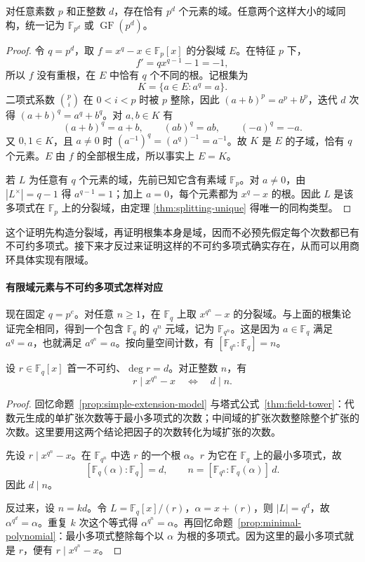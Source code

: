 \documentclass[lang=cn,a4paper,fontset=none,zihao=false,10pt,openany,twoside]{beautybook}
\numberwithin{algorithm}{chapter}
\begin{document}
\begin{theorem}[有限域的存在与唯一性]\label{thm:finite-field-existence}
对任意素数 $p$ 和正整数 $d$，存在恰有 $p^d$ 个元素的域。任意两个这样大小的域同构，统一记为 $\mathbb F_{p^d}$ 或 $\operatorname{GF}(p^d)$。
\end{theorem}
\begin{proof}
令 $q=p^d$，取 $f=x^q-x\in\mathbb F_p[x]$ 的分裂域 $E$。在特征 $p$ 下，
\[
 f'=qx^{q-1}-1=-1,
\]
所以 $f$ 没有重根，在 $E$ 中恰有 $q$ 个不同的根。记根集为
\[
 K=\{a\in E:a^q=a\}.
\]
二项式系数 $\binom pi$ 在 $0<i<p$ 时被 $p$ 整除，因此 $(a+b)^p=a^p+b^p$，迭代 $d$ 次得 $(a+b)^q=a^q+b^q$。对 $a,b\in K$ 有
\[
 (a+b)^q=a+b,\qquad (ab)^q=ab,\qquad(-a)^q=-a.
\]
又 $0,1\in K$，且 $a\ne0$ 时 $(a^{-1})^q=(a^q)^{-1}=a^{-1}$。故 $K$ 是 $E$ 的子域，恰有 $q$ 个元素。$E$ 由 $f$ 的全部根生成，所以事实上 $E=K$。

若 $L$ 为任意有 $q$ 个元素的域，先前已知它含有素域 $\mathbb F_p$。对 $a\ne0$，由 $|L^\times|=q-1$ 得 $a^{q-1}=1$；加上 $a=0$，每个元素都为 $x^q-x$ 的根。因此 $L$ 是该多项式在 $\mathbb F_p$ 上的分裂域，由定理 \ref{thm:splitting-unique} 得唯一的同构类型。
\end{proof}
这个证明先构造分裂域，再证明根集本身是域，因而不必预先假定每个次数都已有不可约多项式。接下来才反过来证明这样的不可约多项式确实存在，从而可以用商环具体实现有限域。

\paragraph{有限域元素与不可约多项式怎样对应}
现在固定 $q=p^e$。对任意 $n\ge1$，在 $\mathbb F_q$ 上取 $x^{q^n}-x$ 的分裂域。与上面的根集论证完全相同，得到一个包含 $\mathbb F_q$ 的 $q^n$ 元域，记为 $\mathbb F_{q^n}$。这是因为 $a\in\mathbb F_q$ 满足 $a^q=a$，也就满足 $a^{q^n}=a$。按向量空间计数，有 $[\mathbb F_{q^n}:\mathbb F_q]=n$。

\begin{proposition}[不可约因子的次数判别]\label{prop:finite-field-degree-test}
设 $r\in\mathbb F_q[x]$ 首一不可约、$\deg r=d$。对正整数 $n$，有
\[
 r\mid x^{q^n}-x\quad\Longleftrightarrow\quad d\mid n.
\]
\end{proposition}
\begin{proof}
回忆命题~\ref{prop:simple-extension-model} 与塔式公式~\ref{thm:field-tower}：代数元生成的单扩张次数等于最小多项式的次数；中间域的扩张次数整除整个扩张的次数。这里要用这两个结论把因子的次数转化为域扩张的次数。

先设 $r\mid x^{q^n}-x$。在 $\mathbb F_{q^n}$ 中选 $r$ 的一个根 $\alpha$。$r$ 为它在 $\mathbb F_q$ 上的最小多项式，故
\[
 [\mathbb F_q(\alpha):\mathbb F_q]=d,\qquad
 n=[\mathbb F_{q^n}:\mathbb F_q(\alpha)]\,d.
\]
因此 $d\mid n$。

反过来，设 $n=kd$。令 $L=\mathbb F_q[x]/(r)$，$\alpha=x+(r)$，则 $|L|=q^d$，故 $\alpha^{q^d}=\alpha$。重复 $k$ 次这个等式得 $\alpha^{q^n}=\alpha$。再回忆命题~\ref{prop:minimal-polynomial}：最小多项式整除每个以 $\alpha$ 为根的多项式。因为这里的最小多项式就是 $r$，便有 $r\mid x^{q^n}-x$。
\end{proof}
\end{document}
